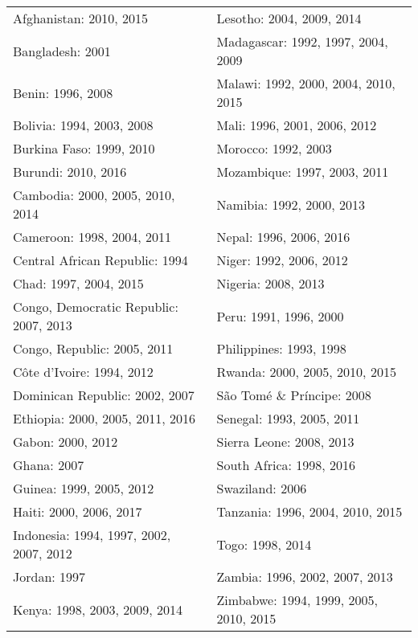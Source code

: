 \begin{tabular}{ll}
\hline
Afghanistan: 2010, 2015                 & Lesotho: 2004, 2009, 2014              \\
Bangladesh: 2001                        & Madagascar: 1992, 1997, 2004, 2009     \\
Benin: 1996, 2008                       & Malawi: 1992, 2000, 2004, 2010, 2015   \\
Bolivia: 1994, 2003, 2008               & Mali: 1996, 2001, 2006, 2012           \\
Burkina Faso: 1999, 2010                & Morocco: 1992, 2003                    \\
Burundi: 2010, 2016                     & Mozambique: 1997, 2003, 2011           \\
Cambodia: 2000, 2005, 2010, 2014        & Namibia: 1992, 2000, 2013              \\
Cameroon: 1998, 2004, 2011              & Nepal: 1996, 2006, 2016                \\
Central African Republic: 1994          & Niger: 1992, 2006, 2012                \\
Chad: 1997, 2004, 2015                  & Nigeria: 2008, 2013                    \\
Congo, Democratic Republic: 2007, 2013  & Peru: 1991, 1996, 2000                 \\
Congo, Republic: 2005, 2011             & Philippines: 1993, 1998                \\
C\^{o}te d'Ivoire: 1994, 2012               & Rwanda: 2000, 2005, 2010, 2015         \\
Dominican Republic: 2002, 2007          & S\~{a}o Tom\'{e} \& Pr\'{i}ncipe: 2008             \\
Ethiopia: 2000, 2005, 2011, 2016        & Senegal: 1993, 2005, 2011              \\
Gabon: 2000, 2012                       & Sierra Leone: 2008, 2013               \\
Ghana: 2007                             & South Africa: 1998, 2016               \\
Guinea: 1999, 2005, 2012                & Swaziland: 2006                        \\
Haiti: 2000, 2006, 2017                 & Tanzania: 1996, 2004, 2010, 2015       \\
Indonesia: 1994, 1997, 2002, 2007, 2012 & Togo: 1998, 2014                       \\
Jordan: 1997                            & Zambia: 1996, 2002, 2007, 2013         \\
Kenya: 1998, 2003, 2009, 2014           & Zimbabwe: 1994, 1999, 2005, 2010, 2015 \\ 
\hline
\end{tabular}